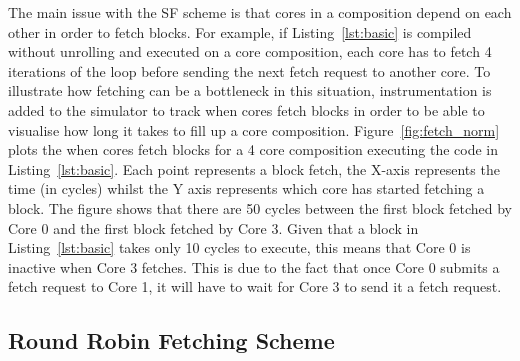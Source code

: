 The main issue with the SF scheme is that cores in a composition depend on each other in order to fetch blocks.
For example, if Listing~\ref{lst:basic} is compiled without unrolling and executed on a core composition, each core has to fetch 4 iterations of the loop before sending the next fetch request to another core.
To illustrate how fetching can be a bottleneck in this situation, instrumentation is added to the simulator to track when cores fetch blocks in order to be able to visualise how long it takes to fill up a core composition.
Figure~\ref{fig:fetch_norm} plots the when cores fetch blocks for a 4 core composition executing the code in Listing~\ref{lst:basic}.
Each point represents a block fetch, the X-axis represents the time (in cycles) whilst the Y axis represents which core has started fetching a block.
The figure shows that there are 50 cycles between the first block fetched by Core 0 and the first block fetched by Core 3.
Given that a block in Listing~\ref{lst:basic} takes only 10 cycles to execute, this means that Core 0 is inactive when Core 3 fetches.
This is due to the fact that once Core 0 submits a fetch request to Core 1, it will have to wait for Core 3 to send it a fetch request.


\subsection{Round Robin Fetching Scheme}


